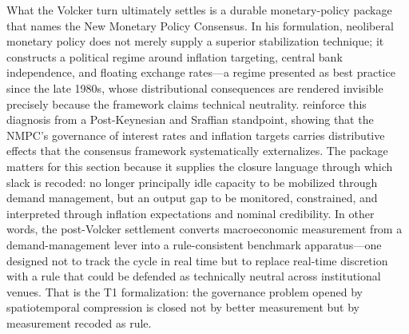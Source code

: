 \documentclass[11pt,a4paper]{article}
\begin{document}

What the Volcker turn ultimately settles is a durable monetary-policy package that
\citet{SaadFilho2018} names the New Monetary Policy Consensus. In his
formulation, neoliberal monetary policy does not merely supply a superior
stabilization technique; it constructs a political regime around inflation
targeting, central bank independence, and floating exchange rates---a regime
presented as best practice since the late 1980s, whose distributional consequences
are rendered invisible precisely because the framework claims technical
neutrality. \citet{LofaroEtAl2025} reinforce this diagnosis from a Post-Keynesian
and Sraffian standpoint, showing that the NMPC's governance of interest rates and
inflation targets carries distributive effects that the consensus framework
systematically externalizes. The package matters for this section because it
supplies the closure language through which slack is recoded: no longer
principally idle capacity to be mobilized through demand management, but an output
gap to be monitored, constrained, and interpreted through inflation expectations
and nominal credibility. In other words, the post-Volcker settlement converts
macroeconomic measurement from a demand-management lever into a rule-consistent
benchmark apparatus---one designed not to track the cycle in real time but to
replace real-time discretion with a rule that could be defended as technically
neutral across institutional venues. That is the T1 formalization: the governance
problem opened by spatiotemporal compression is closed not by better measurement
but by measurement recoded as rule.


\end{document}
